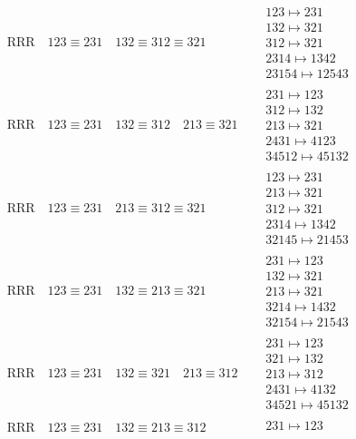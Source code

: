 \documentclass{article}
\begin{document}
\begin{align}
\\
\text{RRR}
\quad
123\equiv231
\quad
132\equiv312\equiv321
\quad
&
\begin{matrix}
123 \mapsto 231
\\
132 \mapsto 321
\\
312 \mapsto 321
\\
2314 \mapsto 1342
\\
23154 \mapsto 12543
\end{matrix}
\\
\text{RRR}
\quad
123\equiv231
\quad
132\equiv312
\quad
213\equiv321
\quad
&
\begin{matrix}
231 \mapsto 123
\\
312 \mapsto 132
\\
213 \mapsto 321
\\
2431 \mapsto 4123
\\
34512 \mapsto 45132
\end{matrix}
\\
\text{RRR}
\quad
123\equiv231
\quad
213\equiv312\equiv321
\quad
&
\begin{matrix}
123 \mapsto 231
\\
213 \mapsto 321
\\
312 \mapsto 321
\\
2314 \mapsto 1342
\\
32145 \mapsto 21453
\end{matrix}
\\
\text{RRR}
\quad
123\equiv231
\quad
132\equiv213\equiv321
\quad
&
\begin{matrix}
231 \mapsto 123
\\
132 \mapsto 321
\\
213 \mapsto 321
\\
3214 \mapsto 1432
\\
32154 \mapsto 21543
\end{matrix}
\\
\text{RRR}
\quad
123\equiv231
\quad
132\equiv321
\quad
213\equiv312
\quad
&
\begin{matrix}
231 \mapsto 123
\\
321 \mapsto 132
\\
213 \mapsto 312
\\
2431 \mapsto 4132
\\
34521 \mapsto 45132
\end{matrix}
\\
\text{RRR}
\quad
123\equiv231
\quad
132\equiv213\equiv312
\quad
&
\begin{matrix}
231 \mapsto 123
\\

\end{matrix}
\end{align}
\end{document}
